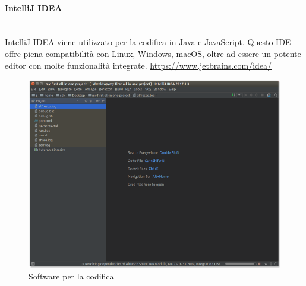 		\paragraph{IntelliJ IDEA} \mbox{}\\
		IntelliJ IDEA viene utilizzato per la codifica in Java e JavaScript. Questo IDE offre piena compatibilità con Linux, Windows, macOS, oltre ad essere un potente editor con molte funzionalità integrate.
		\url{https://www.jetbrains.com/idea/}
		\begin{figure}[H]
			\includegraphics[width=0.99\linewidth]{res/images/intellij.png}
			\caption{Software per la codifica}
		\end{figure} 